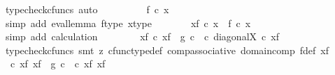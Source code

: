 \begin{isabellebody}
\ {\isacharparenleft}{\kern0pt}typecheck{\isacharunderscore}{\kern0pt}cfuncs{\isacharcomma}{\kern0pt}\ auto{\isacharparenright}{\kern0pt}\isanewline
\ \ \ \ \isamarkupfalse%
\ \isamarkupfalse%
\ {\isachardoublequoteopen}{\isachardot}{\kern0pt}{\isachardot}{\kern0pt}{\isachardot}{\kern0pt}\ {\isacharequal}{\kern0pt}\ f\ {\isasymcirc}\isactrlsub c\ x{\isachardoublequoteclose}\isanewline
\ \ \ \ \ \ \isamarkupfalse%
\ {\isacharparenleft}{\kern0pt}simp\ add{\isacharcolon}{\kern0pt}\ eval{\isacharunderscore}{\kern0pt}lemma\ f{\isacharunderscore}{\kern0pt}type\ x{\isacharunderscore}{\kern0pt}type{\isacharparenright}{\kern0pt}\isanewline
\ \ \ \ \isamarkupfalse%
\ \isamarkupfalse%
\ {\isachardoublequoteopen}{\isasymphi}\isactrlbsub {\isacharbrackleft}{\kern0pt}{\isacharminus}{\kern0pt}{\isacharcomma}{\kern0pt}x{\isacharunderscore}{\kern0pt}f{\isacharbrackright}{\kern0pt}\isactrlesub \ {\isasymcirc}\isactrlsub c\ x\ {\isacharequal}{\kern0pt}\ f\ {\isasymcirc}\isactrlsub c\ x{\isachardoublequoteclose}\isanewline
\ \ \ \ \ \ \isamarkupfalse%
\ {\isacharparenleft}{\kern0pt}simp\ add{\isacharcolon}{\kern0pt}\ calculation{\isacharparenright}{\kern0pt}\isanewline
\ \ \isamarkupfalse%
\isanewline
\ \ \isamarkupfalse%
\ \isamarkupfalse%
\ {\isachardoublequoteopen}{\isasymphi}\isactrlbsub {\isacharbrackleft}{\kern0pt}{\isacharminus}{\kern0pt}{\isacharcomma}{\kern0pt}x{\isacharunderscore}{\kern0pt}f{\isacharbrackright}{\kern0pt}\isactrlesub \ {\isasymcirc}\isactrlsub c\ x{\isacharunderscore}{\kern0pt}f\ {\isacharequal}{\kern0pt}\ g\ {\isasymcirc}\isactrlsub c\ {\isasymphi}\ {\isasymcirc}\isactrlsub c\ diagonal{\isacharparenleft}{\kern0pt}X{\isacharparenright}{\kern0pt}\ {\isasymcirc}\isactrlsub c\ x{\isacharunderscore}{\kern0pt}f{\isachardoublequoteclose}\isanewline
\ \ \ \ \isamarkupfalse%
\ {\isacharparenleft}{\kern0pt}typecheck{\isacharunderscore}{\kern0pt}cfuncs{\isacharcomma}{\kern0pt}\ smt\ {\isacharparenleft}{\kern0pt}z{}{\isacharparenright}{\kern0pt}\ cfunc{\isacharunderscore}{\kern0pt}type{\isacharunderscore}{\kern0pt}def\ comp{\isacharunderscore}{\kern0pt}associative\ domain{\isacharunderscore}{\kern0pt}comp\ f{\isacharunderscore}{\kern0pt}def\ x{\isacharunderscore}{\kern0pt}f{\isacharparenright}{\kern0pt}\isanewline
\ \ \isamarkupfalse%
\ \isamarkupfalse%
\ {\isachardoublequoteopen}{\isasymphi}\ {\isasymcirc}\isactrlsub c\ {\isasymlangle}x{\isacharunderscore}{\kern0pt}f{\isacharcomma}{\kern0pt}\ x{\isacharunderscore}{\kern0pt}f{\isasymrangle}\ {\isacharequal}{\kern0pt}\ g\ {\isasymcirc}\isactrlsub c\ {\isasymphi}\ {\isasymcirc}\isactrlsub c\ {\isasymlangle}x{\isacharunderscore}{\kern0pt}f{\isacharcomma}{\kern0pt}\ x{\isacharunderscore}{\kern0pt}f{\isasymrangle}{\isachardoublequoteclose}\isanewline

\end{isabellebody}
